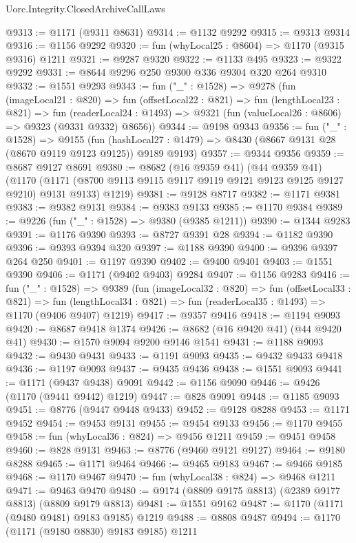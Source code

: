 \begin{lexlean}{Uorc.Integrity.ClosedArchiveCallLaws}
\begin{coremodule}
@9313 := @1171 (@9311 @8631)
@9314 := @1132 @9292
@9315 := @9313 @9314
@9316 := @1156 @9292
@9320 := fun (whyLocal25 : @8604) => @1170 (@9315 @9316) @1211
@9321 := @9287 @9320
@9322 := @1133 @495
@9323 := @9322 @9292
@9331 := @8644 @9296 @250 @9300 @336 @9304 @320 @264 @9310
@9332 := @1551 @9293
@9343 := fun ("_" : @1528) =>
  @9278
    (fun (imageLocal21 : @820) =>
    fun (offsetLocal22 : @821) =>
    fun (lengthLocal23 : @821) =>
    fun (readerLocal24 : @1493) => @9321 (fun (valueLocal26 : @8606) => @9323 (@9331 @9332) @8656))
@9344 := @9198 @9343
@9356 := fun ("_" : @1528) =>
  @9155 (fun (hashLocal27 : @1479) => @8430 (@8667 @9131 @28 (@8670 @9119 @9123 @9125)) @9189 @9193)
@9357 := @9344 @9356
@9359 := @8687 @9127 @8691
@9380 := @8682
    (@16 @9359 @41)
    (@44 @9359 @41)
    (@1170 (@1171 (@8700 @9113 @9115 @9117 @9119 @9121 @9123 @9125 @9127 @9210) @9131 @9133) @1219)
@9381 := @9128 @8717
@9382 := @1171 @9381
@9383 := @9382 @9131
@9384 := @9383 @9133
@9385 := @1170 @9384
@9389 := @9226 (fun ("_" : @1528) => @9380 (@9385 @1211))
@9390 := @1344 @9283
@9391 := @1176 @9390
@9393 := @8727 @9391 @28
@9394 := @1182 @9390
@9396 := @9393 @9394 @320
@9397 := @1188 @9390
@9400 := @9396 @9397 @264 @250
@9401 := @1197 @9390
@9402 := @9400 @9401
@9403 := @1551 @9390
@9406 := @1171 (@9402 @9403) @9284
@9407 := @1156 @9283
@9416 := fun ("_" : @1528) =>
  @9389
    (fun (imageLocal32 : @820) =>
    fun (offsetLocal33 : @821) =>
    fun (lengthLocal34 : @821) => fun (readerLocal35 : @1493) => @1170 (@9406 @9407) @1219)
@9417 := @9357 @9416
@9418 := @1194 @9093
@9420 := @8687 @9418 @1374
@9426 := @8682 (@16 @9420 @41) (@44 @9420 @41)
@9430 := @1570 @9094 @9200 @9146 @1541
@9431 := @1188 @9093
@9432 := @9430 @9431
@9433 := @1191 @9093
@9435 := @9432 @9433 @9418
@9436 := @1197 @9093
@9437 := @9435 @9436
@9438 := @1551 @9093
@9441 := @1171 (@9437 @9438) @9091
@9442 := @1156 @9090
@9446 := @9426 (@1170 (@9441 @9442) @1219)
@9447 := @828 @9091
@9448 := @1185 @9093
@9451 := @8776 (@9447 @9448 @9433)
@9452 := @9128 @8288
@9453 := @1171 @9452
@9454 := @9453 @9131
@9455 := @9454 @9133
@9456 := @1170 @9455
@9458 := fun (whyLocal36 : @824) => @9456 @1211
@9459 := @9451 @9458
@9460 := @828 @9131
@9463 := @8776 (@9460 @9121 @9127)
@9464 := @9180 @8288
@9465 := @1171 @9464
@9466 := @9465 @9183
@9467 := @9466 @9185
@9468 := @1170 @9467
@9470 := fun (whyLocal38 : @824) => @9468 @1211
@9471 := @9463 @9470
@9480 := @9174 (@8809 @9175 @8813) (@2389 @9177 @8813) (@8809 @9179 @8813)
@9481 := @1551 @9162
@9487 := @1170 (@1171 (@9480 @9481) @9183 @9185) @1219
@9488 := @8808 @9487
@9494 := @1170 (@1171 (@9180 @8830) @9183 @9185) @1211

\end{coremodule}
\end{lexlean}

